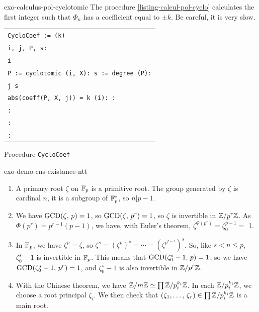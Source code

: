  
\begin{correction}{exo-calculus-pol-cyclotomic}
The procedure \Maple{} \ref{listing-calcul-pol-cyclo} calculates the first integer such that $ \Phi_n $ has a coefficient equal to $ \pm k $. Be careful, it is very slow.

\begin{listing} 
\begin{footnotesize} 
{\upshape
\begin{tabular}{l} \texttt{CycloCoef := \pproc{} (k)} \\
\quad \texttt{\plocal i, j, P, s:} \\
\quad \texttt{\pfor i \pfrom 0 \pto 10000 \pdo} \\
\quad \quad \texttt{P := cyclotomic (i, X): s := degree (P):} \\
\quad \quad \texttt{\pfor j \pfrom 0 \pto s \pdo} \\
\quad \quad \quad \texttt{\pif abs(coeff(P, X, j)) = k \pthen \preturn{}(i): \pend \pif{}:} \\
\quad \quad \texttt{\pend \pdo{}:} \\
\quad \texttt{\pend \pdo{}:} \\
\texttt{\pend \pproc{}:} \\
\end{tabular}
}
\end{footnotesize}
\caption{Procedure \texttt{\upshape CycloCoef}}
\label{listing-calcul-pol-cyclo}
\end{listing}
\end{correction}
 
 
\begin{correction}{exo-demo-cns-existance-ntt}
\begin{enumerate}
\item {} A primary root $ \zeta $ on $ \mathbb{F}_p $ is a primitive root. The group generated by $ \zeta $ is cardinal $ n $, it is a subgroup of $ \mathbb{F}_p^* $, so $ n | p-1 $.
\item We have $ \operatorname{GCD} (\zeta, \, p) = 1 $, so $ \operatorname{GCD} (\zeta, \, p^r) = 1 $, so $ \zeta $ is invertible in $ \mathbb{Z}/p^r \mathbb{Z} $. As $ \Phi (p^r) = p^{r-1} (p-1) $, we have, with Euler's theorem, $ \zeta^{\Phi (p^r)} = \zeta_0^{p-1} = $ 1.
\item In $ \mathbb{F}_p $, we have $ \zeta^p = \zeta $, so $ \zeta^s = (\zeta^p)^s = \cdots = (\zeta^{p^{r-1}})^s $. So, like $ s <n \leq p $, $ \zeta_0^s-1 $ is invertible in $ \mathbb{F}_p $. This means that $ \operatorname{GCD} (\zeta_0^s-1, \, p) = 1 $, so we have $ \operatorname{GCD} (\zeta_0^s-1, \, p^r) = 1 $, and $ \zeta_0^s-1 $ is also invertible in $ \mathbb{Z}/p^r \mathbb{Z} $.
\item With the Chinese theorem, we have $ \mathbb{Z}/m \mathbb{Z} \simeq \prod{\mathbb{Z}/p_i^{k_i} \mathbb{Z}} $. In each $ \mathbb{Z}/p_i^{k_i} \mathbb{Z} $, we choose a root  principal $ \zeta_i $. We then check that $ (\zeta_1, \ldots, \, \zeta_r) \in \prod{\mathbb{Z}/p_i^{k_i} \mathbb{Z}} $ is a main  root.
\end{enumerate}
\end{correction}
 
